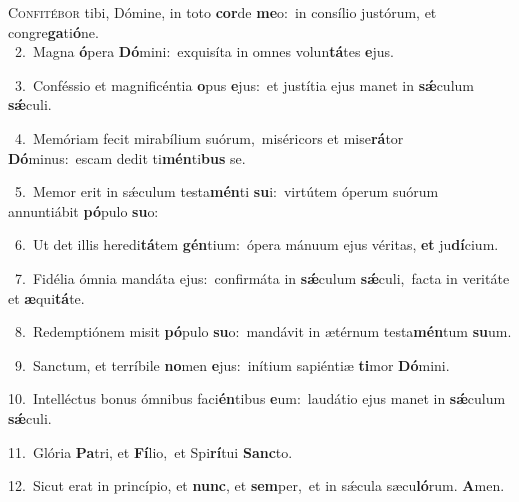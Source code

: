 \lettrine{\initial\textcolor{\initialcolor}{C}}{onfitébor} tibi, Dómine, in toto \textbf{cor}\-de \textbf{me}\-o:~\star in consílio justórum, et congre\-\textbf{ga}\-ti\-\textbf{ó}\-ne.\\
{\numbfont\textcolor{\numbcolor}{~2.}}~Magna \textbf{ó}\-pera \textbf{Dó}\-mini:~\star exquisíta in omnes volun\-\textbf{tá}\-tes \textbf{e}\-jus.\par
{\numbfont\textcolor{\numbcolor}{~3.}}~Conféssio et magnificéntia \textbf{o}\-pus \textbf{e}\-jus:~\star et justítia ejus manet in \textbf{sǽ}\-culum \textbf{sǽ}\-culi.\par
{\numbfont\textcolor{\numbcolor}{~4.}}~Memóriam fecit mirabílium suórum,~\dagger miséricors et mise\-\textbf{rá}\-tor \textbf{Dó}\-minus:~\star escam dedit ti\-\textbf{mén}\-ti\textbf{bus} se.\par
{\numbfont\textcolor{\numbcolor}{~5.}}~Memor erit in sǽculum testa\-\textbf{mén}\-ti \textbf{su}\-i:~\star virtútem óperum suórum annuntiábit \textbf{pó}\-pulo \textbf{su}\-o:\par
{\numbfont\textcolor{\numbcolor}{~6.}}~Ut det illis heredi\-\textbf{tá}\-tem \textbf{gén}\-tium:~\star ópera mánuum ejus véritas, \textbf{et} ju\-\textbf{dí}\-cium.\par
{\numbfont\textcolor{\numbcolor}{~7.}}~Fidélia ómnia mandáta ejus:~\dagger confirmáta in \textbf{sǽ}\-culum \textbf{sǽ}\-culi,~\star facta in veritáte et \textbf{æ}\-qui\-\textbf{tá}\-te.\par
{\numbfont\textcolor{\numbcolor}{~8.}}~Redemptiónem misit \textbf{pó}\-pulo \textbf{su}\-o:~\star mandávit in ætérnum testa\-\textbf{mén}\-tum \textbf{su}\-um.\par
{\numbfont\textcolor{\numbcolor}{~9.}}~Sanctum, et terríbile \textbf{no}\-men \textbf{e}\-jus:~\star inítium sapiéntiæ \textbf{ti}\-mor \textbf{Dó}\-mini.\par
{\numbfont\textcolor{\numbcolor}{10.}}~Intelléctus bonus ómnibus faci\-\textbf{én}\-tibus \textbf{e}\-um:~\star laudátio ejus manet in \textbf{sǽ}\-culum \textbf{sǽ}\-culi.\par
{\numbfont\textcolor{\numbcolor}{11.}}~Glória \textbf{Pa}\-tri, et \textbf{Fí}\-lio,~\star et Spi\-\textbf{rí}\-tui \textbf{Sanc}\-to.\par
{\numbfont\textcolor{\numbcolor}{12.}}~Sicut erat in princípio, et \textbf{nunc}\-, et \textbf{sem}\-per,~\star et in sǽcula sæcu\-\textbf{ló}\-rum. \textbf{A}\-men.\par
